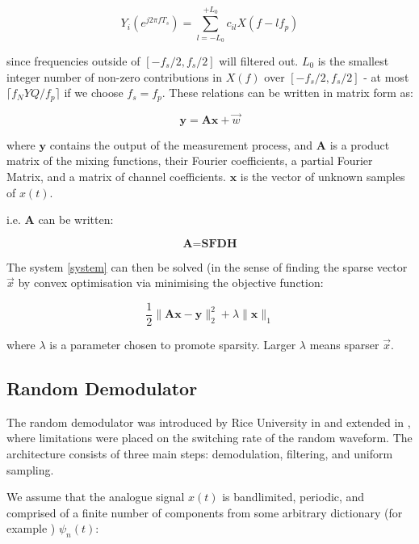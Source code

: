 \begin{equation}
Y_i\left(e^{j 2 \pi f T_s }\right) = \sum_{l = -L_0}^{+L_0} c_{il} X\left(f-lf_p\right)
\end{equation}

since frequencies outside of \([-f_s/2, f_s/2]\) will filtered out. \(L_0\) is the smallest integer number of non-zero contributions in \(X\left(f\right)\) over \([-f_s/2, f_s/2]\) - at most \(\lceil f_NYQ/f_p\rceil\) if we choose \(f_s = f_p\). These relations can be written in matrix form as:

\begin{equation}
\textbf{y} = \textbf{A}\textbf{x} + \vec{w}
\label{system}
\end{equation}

where \(\textbf{y}\) contains the output of the measurement process, and \(\textbf{A}\) is a product matrix of the mixing functions, their Fourier coefficients, a partial Fourier Matrix, and a matrix of channel coefficients. \(\textbf{x}\) is the vector of unknown samples of \(x\left(t\right)\). 

i.e. \(\textbf{A}\) can be written: 

\begin{equation}
\textbf{A} = \textbf{S} \textbf{F} \textbf{D} \textbf{H}
\end{equation}

The system  \ref{system} can then be solved (in the sense of finding the sparse vector \(\vec{x}\) by convex optimisation via minimising the objective function:

\begin{equation}
\frac{1}{2}\|\textbf{Ax}-\textbf{y}\|_2^2 + \lambda \|\textbf{x}\|_1
\end{equation}

where \(\lambda\) is a parameter chosen to promote sparsity. Larger \(\lambda\) means sparser \(\vec{x}\).

\subsection{Random Demodulator}
The random demodulator was introduced by Rice University in \cite{kirolos2006analog} and extended in \cite{ harms2013constrained}, where limitations were placed on the switching rate of the random waveform. The architecture consists of three main steps: demodulation, filtering, and uniform sampling. 

We assume that the analogue signal \(x\left(t\right)\) is bandlimited, periodic, and comprised of a finite number of components from some arbitrary dictionary (for example ) \(\psi_n\left(t\right)\):

